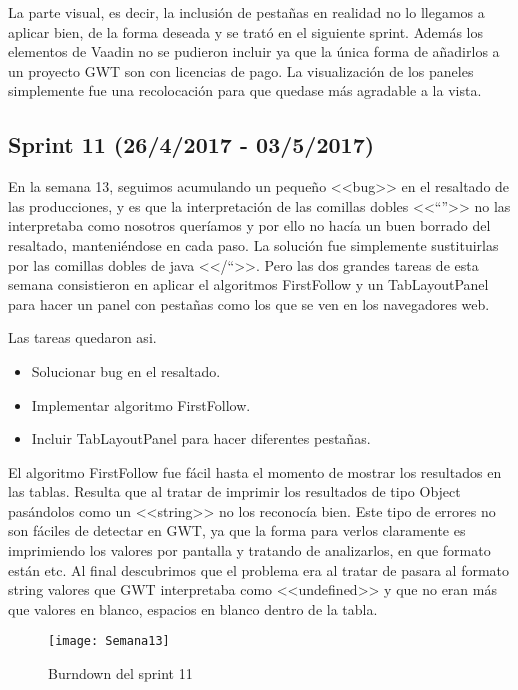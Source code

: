 La parte visual, es decir, la inclusión de pestañas en realidad no lo llegamos a aplicar bien, de la forma deseada y se trató en el siguiente sprint. Además los elementos de Vaadin no se pudieron incluir ya que la única forma de añadirlos a un proyecto GWT son con licencias de pago. La visualización de los paneles simplemente fue una recolocación para que quedase más agradable a la vista.


\subsection{Sprint 11 (26/4/2017 - 03/5/2017)}

En la semana 13, seguimos acumulando un pequeño <<bug>> en el resaltado de las producciones, y es que la interpretación de las comillas dobles <<``''>> no las interpretaba como nosotros queríamos y por ello no hacía un buen borrado del resaltado, manteniéndose en cada paso. La solución fue simplemente sustituirlas por las comillas dobles de java <</``>>. Pero las dos grandes tareas de esta semana consistieron en aplicar el algoritmos FirstFollow y un TabLayoutPanel para hacer un panel con pestañas como los que se ven en los navegadores web.

Las tareas quedaron asi.

\begin{itemize}
\item Solucionar bug en el resaltado.
\item Implementar algoritmo FirstFollow.
\item Incluir TabLayoutPanel para hacer diferentes pestañas.
\end{itemize}

El algoritmo FirstFollow fue fácil hasta el momento de mostrar los resultados en las tablas. Resulta que al tratar de imprimir los resultados de tipo Object pasándolos como un <<string>> no los reconocía bien. Este tipo de errores no son fáciles de detectar en GWT, ya que la forma para verlos claramente es imprimiendo los valores por pantalla y tratando de analizarlos, en que formato están etc. Al final descubrimos que el problema era al tratar de pasara al formato string valores que GWT interpretaba como <<undefined>> y que no eran más que valores en blanco, espacios en blanco dentro de la tabla. 

\begin{figure}[h]
\centering
\texttt{[image: Semana13]}
\caption{Burndown del sprint 11}
\label{fig:A.10}
\end{figure}

